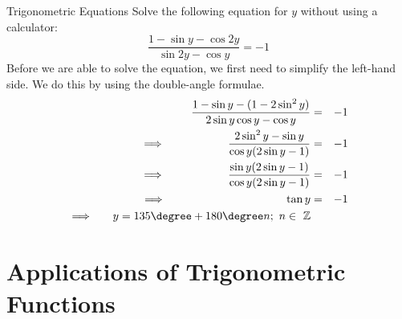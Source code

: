 \begin{wex}{Trigonometric Equations}
{
Solve the following equation for $y$ without using a calculator:
$$\frac{1-\sin y -\cos 2y}{\sin 2y-\cos y}=-1$$}
{
Before we are able to solve the equation, we first need to simplify the left-hand side. We do this by using the double-angle formulae. 
\begin{eqnarray*}
\frac{1-\sin y-(1-2 \sin^2y)}{2\sin y \cos y - \cos y}&=&-1\\
\implies \ \ \qquad \qquad \ \ \frac{2\sin^2y-\sin y}{\cos y (2 \sin y -1)}&=&-1\\
\implies \ \qquad \qquad \  \ \ \frac{\sin y(2\sin y -1)}{\cos y (2\sin y-1)}&=&-1\\
\implies \ \qquad \ \qquad \qquad \ \ \, \qquad \ \ \ \tan y &=&-1 \\
\implies \ \ \,\ \ y=135\degree+180\degree n; \ n\in \ \mathbb{Z}
\end{eqnarray*}
}
\end{wex}

\section{Applications of Trigonometric Functions}

